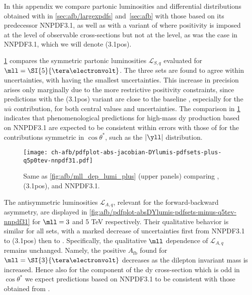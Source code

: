 
In this appendix we compare partonic luminosities
and \lhc differential distributions obtained with  in
\cref{sec:afb/largexpdfs}
and~\ref{sec:afb} with those based 
on its predecessor
NNPDF3.1, as well as with a variant of 
where positivity is imposed at the level of observable cross-sections but
not at the \pdf level, as was the case in  NNPDF3.1, which we will denote
(3.1pos).

\cref{fig:afb/pdfplot-absDYlumis-pdfsets-plus-q5tev-nnpdf31}
compares the 
symmetric partonic luminosities $\mathcal{L}_{S,q}$
evaluated for $\mll=\SI{5}{\tera\electronvolt}$.
%
The three sets are found to agree within uncertainties,
with  having the smallest uncertainties.
%
This increase in precision
arises only marginally due to the more restrictive positivity constraints,
since predictions with the (3.1pos) variant 
are close to the baseline , especially 
for the $u\bar{u}$ contribution, for both central values and uncertainties.
%
The comparison in \cref{fig:afb/pdfplot-absDYlumis-pdfsets-plus-q5tev-nnpdf31}
indicates that phenomenological predictions for high-mass \acrlong{dy}
production based on NNPDF3.1 are expected
to be consistent within errors with those of  for the contributions
symmetric in $\cos\theta^*$, such as the $|\yll|$ distribution.

\begin{figure}[!t]
 \centering
 \texttt{[image: ch-afb/pdfplot-abs-jacobian-DYlumis-pdfsets-plus-q5p0tev-nnpdf31.pdf]}
 \caption{Same as \cref{fig:afb/mll_dep_lumi_plus} (upper panels) comparing
, (3.1pos), and NNPDF3.1.
 }    
 \label{fig:afb/pdfplot-absDYlumis-pdfsets-plus-q5tev-nnpdf31}
\end{figure}

The antisymmetric luminosities $\mathcal{L}_{A,q}$, relevant for the
forward-backward asymmetry, are displayed in \cref{fig:afb/pdfplot-absDYlumis-pdfsets-minus-q5tev-nnpdf31}
for $\mll = 3$ and 5 TeV respectively.
%
Their qualitative behavior is similar for all  \pdf sets,
with a marked decrease of \pdf uncertainties first from NNPDF3.1
to  (3.1pos)  then
to .
%
Specifically, the qualitative $\mll$ dependence
of $\mathcal{L}_{A,q}$ remains unchanged. Namely, the positive $A_{\text{fb}}$
found for $\mll= \SI{3}{\tera\electronvolt}$ decreases 
as the dilepton invariant mass is increased.
%
Hence also for the component of the \acrlong{dy} cross-section which is odd
in $\cos\theta^*$ we expect \lhc predictions based on NNPDF3.1 to be consistent
with those obtained from .

